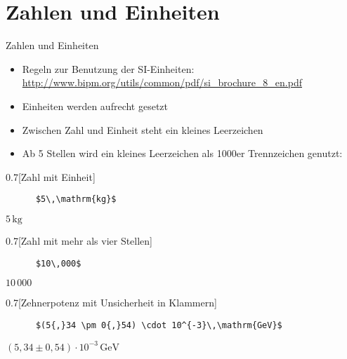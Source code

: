 \section{Zahlen und Einheiten}

\begin{frame}[fragile]{Zahlen und Einheiten}
  \begin{itemize}
    \item Regeln zur Benutzung der SI-Einheiten: \\
      \url{http://www.bipm.org/utils/common/pdf/si_brochure_8_en.pdf}
    \item Einheiten werden aufrecht gesetzt
    \item Zwischen Zahl und Einheit steht ein kleines Leerzeichen
    \item Ab 5 Stellen wird ein kleines Leerzeichen als 1000er Trennzeichen genutzt:
  \end{itemize}

  \begin{CodeExample}{0.7}[Zahl mit Einheit]
    \begin{lstlisting}
      $5\,\mathrm{kg}$
    \end{lstlisting}
    \CodeResult
    $5\,\mathrm{kg}$
  \end{CodeExample}
  \begin{CodeExample}{0.7}[Zahl mit mehr als vier Stellen]
    \begin{lstlisting}
      $10\,000$
    \end{lstlisting}
    \CodeResult
    $10\,000$
  \end{CodeExample}
  \begin{CodeExample}{0.7}[Zehnerpotenz mit Unsicherheit in Klammern]
    \begin{lstlisting}
      $(5{,}34 \pm 0{,}54) \cdot 10^{-3}\,\mathrm{GeV}$
    \end{lstlisting}
    \CodeResult
    $(5{,}34 \pm 0{,}54) \cdot 10^{-3}\,\mathrm{GeV}$
  \end{CodeExample}
  
\end{frame}

